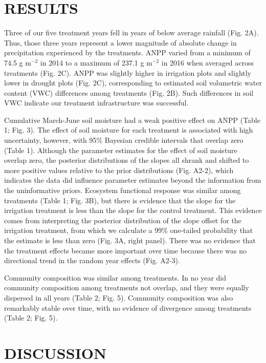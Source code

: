 \documentclass[fleqn,10pt,lineno]{wlpeerj} %
\begin{document}
\section{RESULTS}\label{results}

Three of our five treatment years fell in years of below average
rainfall (Fig. 2A). Thus, those three years represent a lower magnitude
of absolute change in precipitation experienced by the treatments. ANPP
varied from a minimum of 74.5 g m\(^{-2}\) in 2014 to a maximum of 237.1
g m\(^{-2}\) in 2016 when averaged across treatments (Fig. 2C). ANPP was
slightly higher in irrigation plots and slightly lower in drought plots
(Fig. 2C), corresponding to estimated soil volumetric water content
(VWC) differences among treatments (Fig. 2B). Such differences in soil
VWC indicate our treatment infrastructure was successful.

Cumulative March-June soil moisture had a weak positive effect on ANPP
(Table 1; Fig. 3). The effect of soil moisture for each treatment is
associated with high uncertainty, however, with 95\% Bayesian credible
intervals that overlap zero (Table 1). Although the parameter estimates
for the effect of soil moisture overlap zero, the posterior
distributions of the slopes all shrank and shifted to more positive
values relative to the prior distributions (Fig. A2-2), which indicates
the data did influence parameter estimates beyond the information from
the uninformative priors. Ecosystem functional response was similar
among treatments (Table 1; Fig. 3B), but there is evidence that the
slope for the irrigation treatment is less than the slope for the
control treatment. This evidence comes from interpreting the posterior
distribution of the slope offset for the irrigation treatment, from
which we calculate a 99\% one-tailed probability that the estimate is
less than zero (Fig. 3A, right panel). There was no evidence that the
treatment effects became more important over time because there was no
directional trend in the random year effects (Fig. A2-3).

Community composition was similar among treatments. In no year did
community composition among treatments not overlap, and they were
equally dispersed in all years (Table 2; Fig. 5). Community composition
was also remarkably stable over time, with no evidence of divergence
among treatments (Table 2; Fig. 5).

\section{DISCUSSION}\label{discussion}
\end{document}
